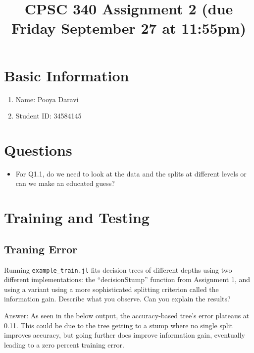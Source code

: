 \documentclass{article}
\def\ans#1{\par\gre{Answer: #1}}
\def\blu#1{{\color{blu}#1}}
\def\gre#1{{\color{gre}#1}}
\def\items#1{\begin{itemize}#1\end{itemize}}
\def\enum#1{\begin{enumerate}#1\end{enumerate}}
\begin{document}
\title{CPSC 340 Assignment 2 (due Friday September 27 at 11:55pm)}
\author{}
\date{}
\maketitle

\vspace{-6em}

\section*{Basic Information}

\blu{\enum{
\item Name: Pooya Daravi
\item Student ID: 34584145
}
}

\section*{Questions}

\items{
    \item For Q1.1, do we need to look at the data and the splits at different levels or can we make an educated guess?
}

\section{Training and Testing}

\subsection{Traning Error}

Running \texttt{example\_train.jl} fits decision trees of different depths using two different implementations:
the ``decisionStump'' function from Assignment 1, and using a variant using a more sophisticated splitting criterion called the information gain. \blu{Describe what you observe. Can you explain the results?}

\ans{
    As seen in the below output, the accuracy-based tree's error plateaus at 0.11. This could be due to the tree getting to a stump where no single split improves accuracy, but going further does improve information gain, eventually leading to a zero percent training error.
}
\end{document}
